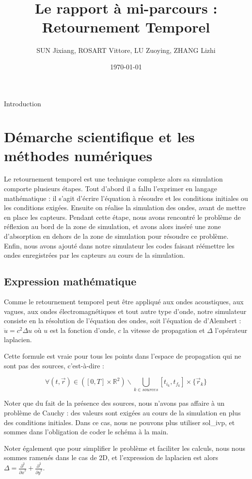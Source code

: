 \documentclass[11pt, a4paper]{article}
\title{Le rapport à mi-parcours : Retournement Temporel}
\author{SUN Jixiang, ROSART Vittore, LU Zuoying, ZHANG Lizhi}
\date{\today}
\begin{document}
\maketitle
\thispagestyle{fancy}


Introduction

\section{Démarche scientifique et les méthodes numériques}
Le retournement temporel est une technique complexe alors sa simulation comporte plusieurs étapes. Tout d'abord il a fallu l'exprimer en langage mathématique : il s'agit d'écrire l'équation à résoudre et les conditions initiales ou les conditions exigées. Ensuite on réalise la simulation des ondes, avant de mettre en place les capteurs. Pendant cette étape, nous avons rencontré le problème de réflexion au bord de la zone de simulation, et avons alors inséré une zone d'absorption en dehors de la zone de simulation pour résoudre ce problème. Enfin, nous avons ajouté dans notre simulateur les codes faisant réémettre les ondes enregistrées par les capteurs au cours de la simulation.
\subsection{Expression mathématique}
Comme le retournement temporel peut être appliqué aux ondes acoustiques, aux vagues, aux ondes électromagnétiques et tout autre type d'onde, notre simulateur consiste en la résolution de l'équation des ondes, soit l'équation de d'Alembert : $\ddot{u}=c^2\Delta u $ où $u$ est la fonction d'onde, $c$ la vitesse de propagation et $\Delta$ l'opérateur laplacien.

Cette formule est vraie pour tous les points dans l'espace de propagation qui ne sont pas des sources, c'est-à-dire :

$$
    \forall (t,\vec{r})\in ([0,T]\times\mathbb{R}^2)\backslash\bigcup\limits_{k\in sources}[t_{i_k},t_{f_k}]\times\{\vec{r}_k\}
$$

Noter que du fait de la présence des sources, nous n'avons pas affaire à un problème de Cauchy : des valeurs sont exigées au cours de la simulation en plus des conditions initiales. Dans ce cas, nous ne pouvons plus utiliser sol\_ivp, et sommes dans l'obligation de coder le schéma à la main.

Noter également que pour simplifier le problème et faciliter les calculs, nous nous sommes ramenés dans le cas de 2D, et l'expression de laplacien est alors $\Delta=\frac{\partial^2}{{\partial x}^2}+\frac{\partial^2}{{\partial y}^2}$.
\end{document}
